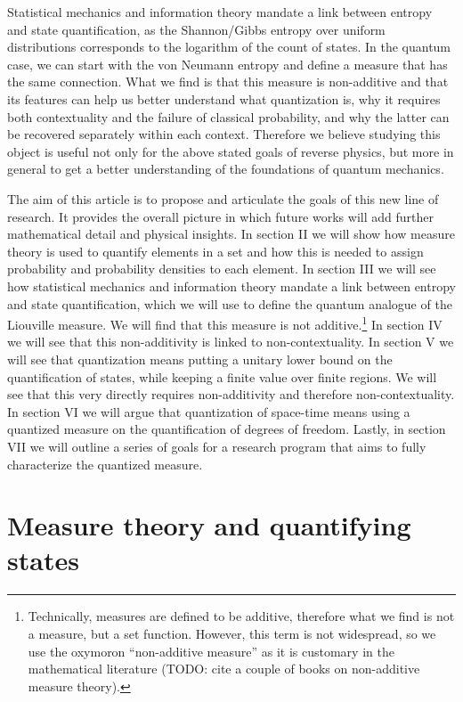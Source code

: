 \documentclass[10pt,twocolumn, nofootinbib]{revtex4-2}
\begin{document}
Statistical mechanics and information theory mandate a link between entropy and state quantification, as the Shannon/Gibbs entropy over uniform distributions corresponds to the logarithm of the count of states. In the quantum case, we can start with the von Neumann entropy and define a measure that has the same connection. What we find is that this measure is non-additive and that its features can help us better understand what quantization is, why it requires both contextuality and the failure of classical probability, and why the latter can be recovered separately within each context. Therefore we believe studying this object is useful not only for the above stated goals of reverse physics, but more in general to get a better understanding of the foundations of quantum mechanics.

The aim of this article is to propose and articulate the goals of this new line of research. It provides the overall picture in which future works will add further mathematical detail and physical insights. In section II we will show how measure theory is used to quantify elements in a set and how this is needed to assign probability and probability densities to each element. In section III we will see how statistical mechanics and information theory mandate a link between entropy and state quantification, which we will use to define the quantum analogue of the Liouville measure. We will find that this measure is not additive.\footnote{Technically, measures are defined to be additive, therefore what we find is not a measure, but a set function. However, this term is not widespread, so we use the oxymoron ``non-additive measure'' as it is customary in the mathematical literature (TODO: cite a couple of books on non-additive measure theory).} In section IV we will see that this non-additivity is linked to non-contextuality. In section V we will see that quantization means putting a unitary lower bound on the quantification of states, while keeping a finite value over finite regions. We will see that this very directly requires non-additivity and therefore non-contextuality. In section VI we will argue that quantization of space-time means using a quantized measure on the quantification of degrees of freedom. Lastly, in section VII we will outline a series of goals for a research program that aims to fully characterize the quantized measure.

\section{Measure theory and quantifying states}
\end{document}
